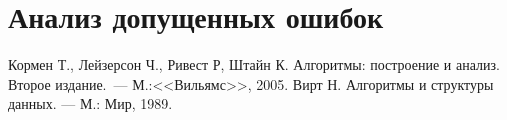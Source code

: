\documentclass[a4paper,12pt,titlepage,final]{article}
\begin{document}
\newpage

\section{Анализ допущенных ошибок}


\newpage
\begin{raggedright}
\begin{thebibliography}{99}
 Кормен Т., Лейзерсон Ч., Ривест Р, Штайн К. Алгоритмы: построение и анализ.
    Второе издание.~--- М.:<<Вильямс>>, 2005.
 Вирт Н. Алгоритмы и структуры данных. — М.: Мир, 1989.
\end{thebibliography}
\end{raggedright}
\end{document}
